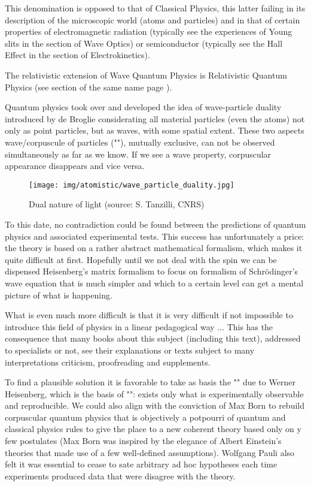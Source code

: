 	This denomination is opposed to that of Classical Physics, this latter failing in its description of the microscopic world (atoms and particles) and in that of certain properties of electromagnetic radiation (typically see the experiences of Young slits in the section of Wave Optics) or semiconductor (typically see the Hall Effect in the section of Electrokinetics).
	
	\begin{tcolorbox}[title=Remark,colframe=black,arc=10pt]
	The relativistic extension of Wave Quantum Physics is Relativistic Quantum Physics (see section of the same name page \pageref{relativistic quantum physics}).
	\end{tcolorbox}
	
	Quantum physics took over and developed the idea of wave-particle duality introduced by de Broglie considerating all material particles (even the atoms) not only as point particles, but as waves, with some spatial extent. These two aspects wave/corpuscule of particles (""), mutually exclusive, can not be observed simultaneously as far as we know. If we see a wave property, corpuscular appearance disappears and vice versa.
	\begin{figure}[H]
		\centering
		\texttt{[image: img/atomistic/wave\_particle\_duality.jpg]}
		\caption{Dual nature of light (source: S. Tanzilli, CNRS)}
	\end{figure}
	To this date, no contradiction could be found between the predictions of quantum physics and associated experimental tests. This success has unfortunately a price: the theory is based on a rather abstract mathematical formalism, which makes it quite difficult at first. Hopefully until we not deal with the spin we can be dispensed Heisenberg's matrix formalism to focus on formalism of Schrödinger's wave equation that is much simpler and which to a certain level can get a mental picture of what is happening.
	
	What is even much more difficult is that it is very difficult if not impossible to introduce this field of physics in a linear pedagogical way ... This has the consequence that many books about this subject (including this text), addressed to specialists or not, see their explanations or texts subject to many interpretations criticism, proofreading and supplements.
	
	To find a plausible solution it is favorable to take as basis the "" due to Werner Heisenberg, which is the basis of "": exists only what is experimentally observable and reproducible. We could also align with the conviction of Max Born to rebuild corpuscular quantum physics that is objectively a potpourri of quantum and classical physics rules to give the place to a new coherent theory based only on y few postulates (Max Born was inspired by the elegance of Albert Einstein's theories that made use of a few well-defined assumptions). Wolfgang Pauli also felt it was essential to cease to sate arbitrary ad hoc hypotheses each time experiments produced data that were disagree with the theory.
	
